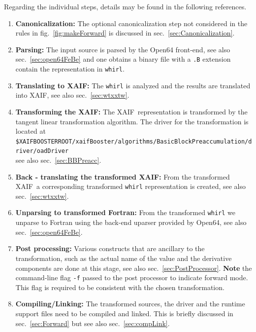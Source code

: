 \documentclass{book}
\newcommand{\xaif}{XAIF}
\newcommand{\refsec}[1]{{sec.~\ref{#1}}}
\newcommand{\reffig}[1]{{fig.~\ref{#1}}}
\begin{document}
Regarding the individual steps, details may be found in the following references.
\begin{enumerate}
\item {\bf Canonicalization:} The optional canonicalization step not considered in the rules in \reffig{fig:makeForward} is discussed in \refsec{sec:Canonicalization}.
\item {\bf Parsing:} The input source is parsed by the Open64 front-end, see also \refsec{sec:open64FeBe} and 
one obtains a binary file with a \lstinline{.B} extension contain the representation in \lstinline{whirl}.
\item {\bf Translating to XAIF:} The \lstinline{whirl} is analyzed and the results are 
translated into \xaif, see also \refsec{sec:wtxxtw}.
\item {\bf Transforming the XAIF:} The \xaif\ representation is transformed by 
the tangent linear transformation algorithm. The driver for the transformation is located at \\[1ex]
\hspace*{.3cm}\lstinline{$XAIFBOOSTERROOT/xaifBooster/algorithms/BasicBlockPreaccumulation/driver/oadDriver} \\[1ex]%
see also \refsec{sec:BBPreacc}.
\item {\bf Back - translating the transformed XAIF:} From the transformed \xaif\ a corresponding transformed \lstinline{whirl} 
representation is created, see also \refsec{sec:wtxxtw}. 
\item {\bf Unparsing to transformed Fortran:} From the transformed \lstinline{whirl} we unparse 
to Fortran using the back-end uparser provided by Open64, see also \refsec{sec:open64FeBe}. 
\item {\bf Post processing:} Various constructs that are ancillary to the transformation, 
such as the actual name of the value and the derivative components are done at this stage, 
see also \refsec{sec:PostProcessor}. 
{\bf Note} the command-line flag \lstinline{-f} passed to the post processor to indicate forward mode. 
This flag is required to be consistent with the chosen transformation.
\item {\bf Compiling/Linking:} The transformed sources, the driver and the runtime support files need to be compiled and linked. This is briefly discussed in \refsec{sec:Forward} but see also \refsec{sec:compLink}.
\end{enumerate}

\end{document}
